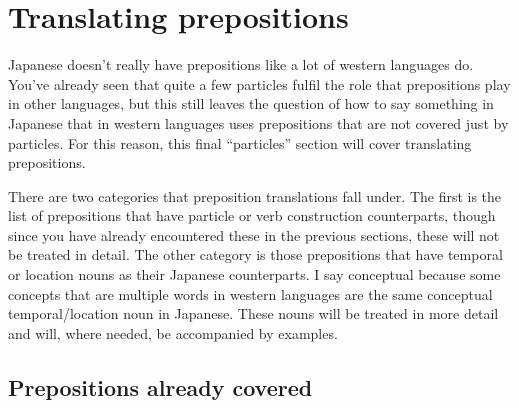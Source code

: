 \documentclass[11pt, b5paper, twoside, openright, onecolumn]{book}
\begin{document}
\section{Translating prepositions}


Japanese doesn’t really have prepositions like a lot of western languages do. You’ve already seen that quite a few particles fulfil the role that prepositions play in other languages‚ but this still leaves the question of how to say something in Japanese that in western languages uses prepositions that are not covered just by particles. For this reason‚ this final “particles” section will cover translating prepositions.

There are two categories that preposition translations fall under. The first is the list of prepositions that have particle or verb construction counterparts‚ though since you have already encountered these in the previous sections‚ these will not be treated in detail. The other category is those prepositions that have temporal or location nouns as their Japanese counterparts. I say conceptual because some concepts that are multiple words in western languages are the same conceptual temporal/location noun in Japanese. These nouns will be treated in more detail and will‚ where needed‚ be accompanied by examples.


\subsection{Prepositions already covered}
\end{document}
